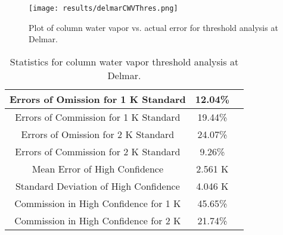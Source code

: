 \documentclass{book}
\begin{document}
\begin{minipage}[c]{0.47\textwidth}
\centering
\begin{figure}[H]
\texttt{[image: results/delmarCWVThres.png]}
\caption{Plot of column water vapor vs. actual error for threshold analysis at Delmar.}
\label{fig:delmarCWVThres}
\end{figure}
\end{minipage}
\begin{minipage}[c]{0.47\textwidth}
\begin{table}[H]
\centering
\footnotesize
\begin{tabular}{ | c | c | c | } \hline
Errors of Omission for 1 K Standard & 12.04\% \\ \hline
Errors of Commission for 1 K Standard & 19.44\% \\ \hline
Errors of Omission for 2 K Standard & 24.07\% \\ \hline
Errors of Commission for 2 K Standard & 9.26\% \\ \hline
Mean Error of High Confidence & 2.561 K \\ \hline
Standard Deviation of High Confidence & 4.046 K \\ \hline
Commission in High Confidence for 1 K & 45.65\% \\ \hline
Commission in High Confidence for 2 K & 21.74\% \\ \hline
\end{tabular}
\caption{Statistics for column water vapor threshold analysis at Delmar.}
\label{tab:delmarCWVThres}
\end{table}
\end{minipage}
\end{document}
